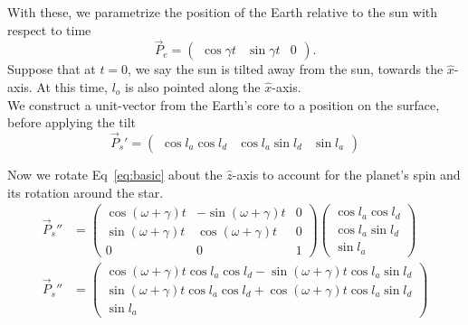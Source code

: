 \documentclass[12pt,a4paper]{article}
\begin{document}
With these, we parametrize the position of the Earth relative to the sun with respect to time 
\begin{equation}\label{eq:sun_earth}
\vec{P}_{e} = \left( \begin{array}{ccc} \cos\gamma t & \sin\gamma t & 0 \end{array}\right).
\end{equation}
Suppose that at \(t=0\), we say the sun is tilted away from the sun, towards the \(\hat{x}\)-axis. At this time, \(l_{o}\) is also pointed along the \(\hat{x}\)-axis. \\

We construct a unit-vector from the Earth's core to a position on the surface, before applying the tilt
\begin{equation}\label{eq:basic}
\vec{P}_{s}' = \left(\begin{array}{ccc}\cos l_{a}\cos l_{d} & \cos l_{a}\sin l_{d} & \sin l_{a} \end{array}\right)
\end{equation}

Now we rotate Eq~\eqref{eq:basic} about the \(\hat{z}\)-axis to account for the planet's spin and its rotation around the star.
\begin{align}
\vec{P}_{s}'' &=\left(\begin{array}{ccc} \cos(\omega + \gamma)t & -\sin(\omega + \gamma) t & 0 \\ \sin(\omega + \gamma) t & \cos(\omega + \gamma) t & 0 \\ 0 & 0 & 1 \end{array} \right) \left(\begin{array}{c}\cos l_{a}\cos l_{d} \\ \cos l_{a}\sin l_{d} \\ \sin l_{a} \end{array}\right) \\
\vec{P}_{s}'' &=  \left(\begin{array}{c} \cos(\omega+\gamma)t\cos l_{a}\cos l_{d} - \sin(\omega+\gamma)t\cos l_{a}\sin l_{d} \\ \sin(\omega + \gamma)t\cos l_{a}\cos l_{d} + \cos(\omega+\gamma)t\cos l_{a}\sin l_{d} \\ \sin l_{a} \end{array}\right) \label{eq:rotated}
\end{align}
\end{document}

